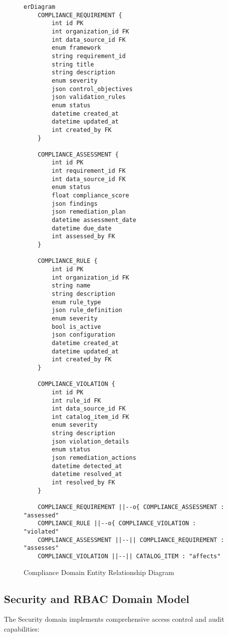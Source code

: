 \documentclass[12pt,a4paper]{article}
\begin{document}
\begin{figure}[H]
\centering
\begin{verbatim}
erDiagram
    COMPLIANCE_REQUIREMENT {
        int id PK
        int organization_id FK
        int data_source_id FK
        enum framework
        string requirement_id
        string title
        string description
        enum severity
        json control_objectives
        json validation_rules
        enum status
        datetime created_at
        datetime updated_at
        int created_by FK
    }
    
    COMPLIANCE_ASSESSMENT {
        int id PK
        int requirement_id FK
        int data_source_id FK
        enum status
        float compliance_score
        json findings
        json remediation_plan
        datetime assessment_date
        datetime due_date
        int assessed_by FK
    }
    
    COMPLIANCE_RULE {
        int id PK
        int organization_id FK
        string name
        string description
        enum rule_type
        json rule_definition
        enum severity
        bool is_active
        json configuration
        datetime created_at
        datetime updated_at
        int created_by FK
    }
    
    COMPLIANCE_VIOLATION {
        int id PK
        int rule_id FK
        int data_source_id FK
        int catalog_item_id FK
        enum severity
        string description
        json violation_details
        enum status
        json remediation_actions
        datetime detected_at
        datetime resolved_at
        int resolved_by FK
    }
    
    COMPLIANCE_REQUIREMENT ||--o{ COMPLIANCE_ASSESSMENT : "assessed"
    COMPLIANCE_RULE ||--o{ COMPLIANCE_VIOLATION : "violated"
    COMPLIANCE_ASSESSMENT ||--|| COMPLIANCE_REQUIREMENT : "assesses"
    COMPLIANCE_VIOLATION ||--|| CATALOG_ITEM : "affects"
\end{verbatim}
\caption{Compliance Domain Entity Relationship Diagram}
\end{figure}

\subsection{Security and RBAC Domain Model}

The Security domain implements comprehensive access control and audit capabilities:
\end{document}
